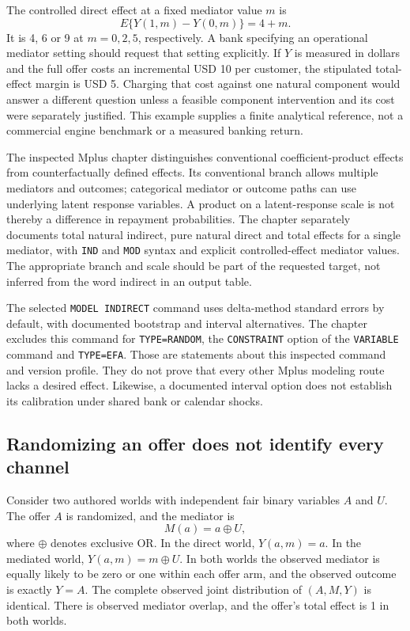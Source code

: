 The controlled direct effect at a fixed mediator value $m$ is
\begin{equation}
 E\{Y(1,m)-Y(0,m)\}=4+m.
 \label{exec20:med-controlled}
\end{equation}
It is 4, 6 or 9 at $m=0,2,5$, respectively. A bank specifying an operational mediator setting should request that setting explicitly. If $Y$ is measured in dollars and the full offer costs an incremental USD 10 per customer, the stipulated total-effect margin is USD 5. Charging that cost against one natural component would answer a different question unless a feasible component intervention and its cost were separately justified. This example supplies a finite analytical reference, not a commercial engine benchmark or a measured banking return.

The inspected Mplus chapter distinguishes conventional coefficient-product effects from counterfactually defined effects. Its conventional branch allows multiple mediators and outcomes; categorical mediator or outcome paths can use underlying latent response variables. A product on a latent-response scale is not thereby a difference in repayment probabilities. The chapter separately documents total natural indirect, pure natural direct and total effects for a single mediator, with \texttt{IND} and \texttt{MOD} syntax and explicit controlled-effect mediator values. The appropriate branch and scale should be part of the requested target, not inferred from the word indirect in an output table.\citep{exec20_med_mplus_ch17}

The selected \texttt{MODEL INDIRECT} command uses delta-method standard errors by default, with documented bootstrap and interval alternatives. The chapter excludes this command for \texttt{TYPE=RANDOM}, the \texttt{CONSTRAINT} option of the \texttt{VARIABLE} command and \texttt{TYPE=EFA}. Those are statements about this inspected command and version profile. They do not prove that every other Mplus modeling route lacks a desired effect. Likewise, a documented interval option does not establish its calibration under shared bank or calendar shocks.

\subsection{Randomizing an offer does not identify every channel}
\label{exec20:med-nonidentification}
Consider two authored worlds with independent fair binary variables $A$ and $U$. The offer $A$ is randomized, and the mediator is
\begin{equation}
 M(a)=a\mathbin{\oplus}U,
 \label{exec20:med-xor}
\end{equation}
where $\oplus$ denotes exclusive OR. In the direct world, $Y(a,m)=a$. In the mediated world, $Y(a,m)=m\mathbin{\oplus}U$. In both worlds the observed mediator is equally likely to be zero or one within each offer arm, and the observed outcome is exactly $Y=A$. The complete observed joint distribution of $(A,M,Y)$ is identical. There is observed mediator overlap, and the offer's total effect is 1 in both worlds.\citep{exec20_med_reference}

